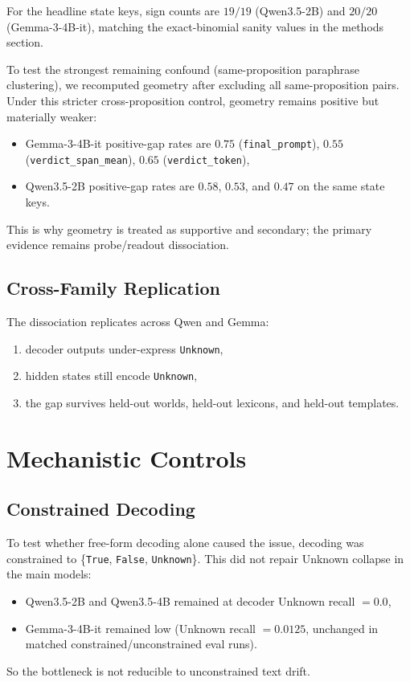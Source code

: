 \documentclass[11pt]{article}
\begin{document}
For the headline state keys, sign counts are \(19/19\) (Qwen3.5-2B) and \(20/20\) (Gemma-3-4B-it), matching the exact-binomial sanity values in the methods section.

To test the strongest remaining confound (same-proposition paraphrase clustering), we recomputed geometry after excluding all same-proposition pairs.
Under this stricter cross-proposition control, geometry remains positive but materially weaker:
\begin{itemize}
  \item Gemma-3-4B-it positive-gap rates are \(0.75\) (\texttt{final\_prompt}), \(0.55\) (\texttt{verdict\_span\_mean}), \(0.65\) (\texttt{verdict\_token}),
  \item Qwen3.5-2B positive-gap rates are \(0.58\), \(0.53\), and \(0.47\) on the same state keys.
\end{itemize}
This is why geometry is treated as supportive and secondary; the primary evidence remains probe/readout dissociation.

\subsection{Cross-Family Replication}
The dissociation replicates across Qwen and Gemma:
\begin{enumerate}
  \item decoder outputs under-express \texttt{Unknown},
  \item hidden states still encode \texttt{Unknown},
  \item the gap survives held-out worlds, held-out lexicons, and held-out templates.
\end{enumerate}

\section{Mechanistic Controls}
\subsection{Constrained Decoding}
To test whether free-form decoding alone caused the issue, decoding was constrained to \{\texttt{True}, \texttt{False}, \texttt{Unknown}\}.
This did not repair Unknown collapse in the main models:
\begin{itemize}
  \item Qwen3.5-2B and Qwen3.5-4B remained at decoder Unknown recall \(=0.0\),
  \item Gemma-3-4B-it remained low (Unknown recall \(=0.0125\), unchanged in matched constrained/unconstrained eval runs).
\end{itemize}
So the bottleneck is not reducible to unconstrained text drift.
\end{document}
